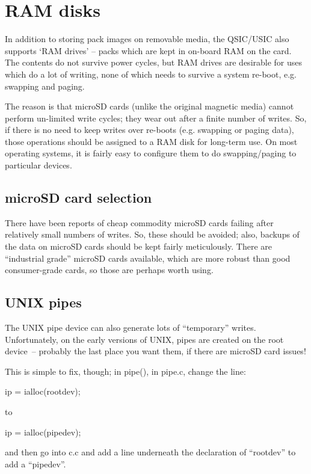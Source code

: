 \section{RAM disks}

In addition to storing pack images on removable media, the QSIC/USIC also
supports `RAM drives' -- packs which are kept in on-board RAM on the card. The
contents do not survive power cycles, but RAM drives are desirable for uses
which do a lot of writing, none of which needs to survive a system re-boot,
e.g. swapping and paging.

The reason is that microSD cards (unlike the original magnetic media) cannot
perform un-limited write cycles; they wear out after a finite number of
writes. So, if there is no need to keep writes over re-boots (e.g. swapping
or paging data), those operations should be assigned to a RAM disk for
long-term use. On most operating systems, it is fairly easy to configure them
to do swapping/paging to particular devices.

\subsection{microSD card selection}

There have been reports of cheap commodity microSD cards failing after relatively
small numbers of writes. So, these should be avoided; also, backups of the
data on microSD cards should be kept fairly meticulously. There are ``industrial
grade'' microSD cards available, which are more robust than good consumer-grade
cards, so those are perhaps worth using.

\subsection{UNIX pipes}

The UNIX pipe device can also generate lots of ``temporary'' writes.
Unfortunately, on the early versions of UNIX, pipes are created on the root
device~-- probably the last place you want them, if there are microSD card issues!

This is simple to fix, though; in pipe(), in pipe.c, change the line:

	ip = ialloc(rootdev);

to

	ip = ialloc(pipedev);

and then go into c.c and add a line underneath the declaration of ``rootdev''
to add a ``pipedev''.

